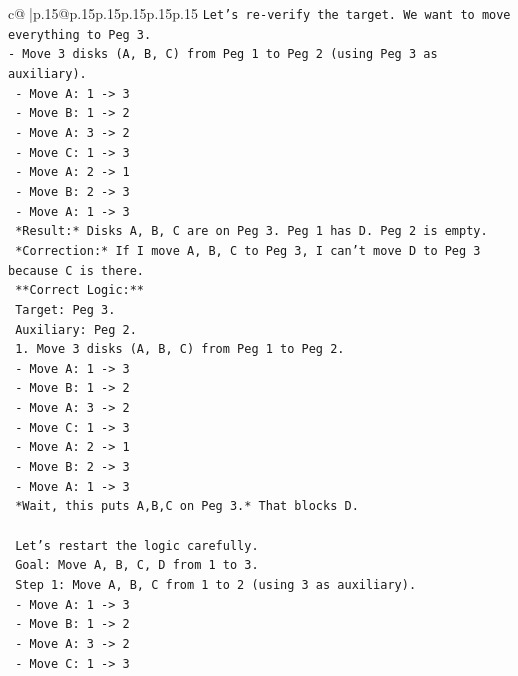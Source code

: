 \documentclass{article}
\begin{document}
{\begin{supertabular}{c@{$\;$}|p{.15\linewidth}@{}p{.15\linewidth}p{.15\linewidth}p{.15\linewidth}p{.15\linewidth}p{.15\linewidth}}
{{{\texttt{Let's re{-}verify the target. We want to move everything to Peg 3.} \\
\texttt{{-} Move 3 disks (A, B, C) from Peg 1 to Peg 2 (using Peg 3 as auxiliary).} \\
\texttt{  {-} Move A: 1 {-}> 3} \\
\texttt{  {-} Move B: 1 {-}> 2} \\
\texttt{  {-} Move A: 3 {-}> 2} \\
\texttt{  {-} Move C: 1 {-}> 3} \\
\texttt{  {-} Move A: 2 {-}> 1} \\
\texttt{  {-} Move B: 2 {-}> 3} \\
\texttt{  {-} Move A: 1 {-}> 3} \\
\texttt{  *Result:* Disks A, B, C are on Peg 3. Peg 1 has D. Peg 2 is empty.} \\
\texttt{  *Correction:* If I move A, B, C to Peg 3, I can't move D to Peg 3 because C is there.} \\
\texttt{  **Correct Logic:**} \\
\texttt{  Target: Peg 3.} \\
\texttt{  Auxiliary: Peg 2.} \\
\texttt{  1. Move 3 disks (A, B, C) from Peg 1 to Peg 2.} \\
\texttt{     {-} Move A: 1 {-}> 3} \\
\texttt{     {-} Move B: 1 {-}> 2} \\
\texttt{     {-} Move A: 3 {-}> 2} \\
\texttt{     {-} Move C: 1 {-}> 3} \\
\texttt{     {-} Move A: 2 {-}> 1} \\
\texttt{     {-} Move B: 2 {-}> 3} \\
\texttt{     {-} Move A: 1 {-}> 3} \\
\texttt{     *Wait, this puts A,B,C on Peg 3.* That blocks D.} \\
\\ 
\texttt{  Let's restart the logic carefully.} \\
\texttt{  Goal: Move A, B, C, D from 1 to 3.} \\
\texttt{  Step 1: Move A, B, C from 1 to 2 (using 3 as auxiliary).} \\
\texttt{     {-} Move A: 1 {-}> 3} \\
\texttt{     {-} Move B: 1 {-}> 2} \\
\texttt{     {-} Move A: 3 {-}> 2} \\
\texttt{     {-} Move C: 1 {-}> 3} \\
}}}
\end{supertabular}}
\end{document}
